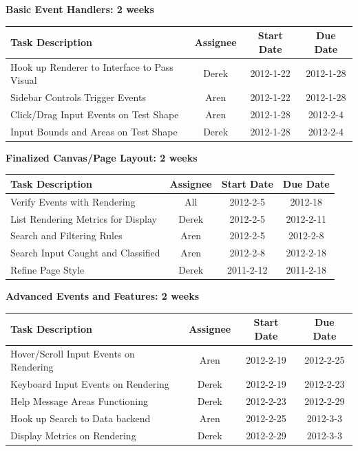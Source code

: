 \documentclass[12pt, letterpaper]{article}
\begin{document}
  \begin{center}
		{\bf Basic Event Handlers: 2 weeks}
    \begin{tabular}{| p{8.3cm} || c | c | c | }
      \hline
      Task Description & Assignee & Start Date & Due Date \\
      \hline
	    Hook up Renderer to Interface to Pass Visual & Derek & 2012-1-22 & 2012-1-28 \\
 	    Sidebar Controls Trigger Events & Aren & 2012-1-22 & 2012-1-28 \\
	    Click/Drag Input Events on Test Shape & Aren & 2012-1-28 & 2012-2-4 \\
	    Input Bounds and Areas on Test Shape & Derek & 2012-1-28 & 2012-2-4 \\
      \hline
    \end{tabular}
  \end{center}

  \begin{center}
		{\bf Finalized Canvas/Page Layout: 2 weeks}
    \begin{tabular}{| p{8.3cm} || c | c | c | }
      \hline
      Task Description & Assignee & Start Date & Due Date \\
      \hline
	    Verify Events with Rendering & All & 2012-2-5 & 2012-18 \\
	    List Rendering Metrics for Display & Derek & 2012-2-5 & 2012-2-11 \\
	    Search and Filtering Rules & Aren & 2012-2-5 & 2012-2-8 \\
	    Search Input Caught and Classified & Aren & 2012-2-8 & 2012-2-18 \\
		Refine Page Style & Derek & 2011-2-12 & 2011-2-18 \\
      \hline
    \end{tabular}
  \end{center}

  \begin{center}
		{\bf Advanced Events and Features: 2 weeks}
    \begin{tabular}{| p{8.3cm} || c | c | c | }
      \hline
      Task Description & Assignee & Start Date & Due Date \\
      \hline
	    Hover/Scroll Input Events on Rendering & Aren & 2012-2-19 & 2012-2-25 \\
	    Keyboard Input Events on Rendering & Derek & 2012-2-19 & 2012-2-23 \\
	    Help Message Areas Functioning & Derek & 2012-2-23 & 2012-2-29 \\
	    Hook up Search to Data backend & Aren & 2012-2-25 & 2012-3-3 \\
	    Display Metrics on Rendering & Derek & 2012-2-29 & 2012-3-3 \\
      \hline
    \end{tabular}
  \end{center}
\end{document}
